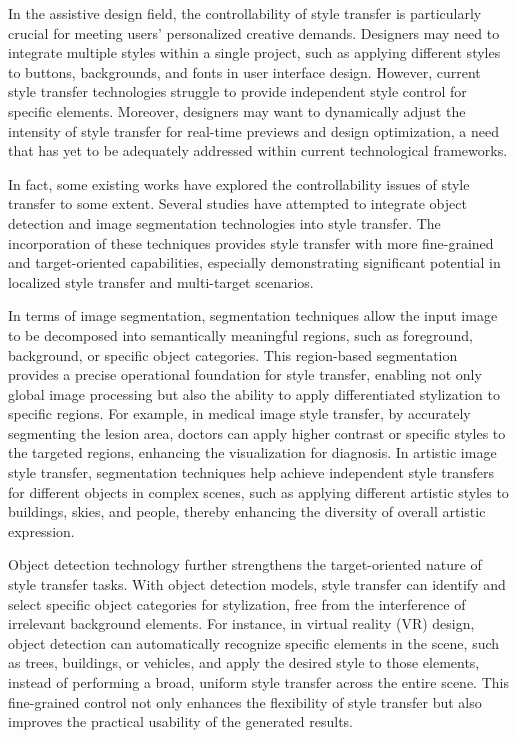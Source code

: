 \documentclass[preprint,12pt]{elsarticle}
\begin{document}
In the assistive design field\citep{10liu2021self,11bae2023unsupervised,12hollein2022stylemesh,13yin20213dstylenet,14yang2022industrial}, the controllability of style transfer is particularly crucial for meeting users' personalized creative demands. Designers may need to integrate multiple styles within a single project, such as applying different styles to buttons, backgrounds, and fonts in user interface design. However, current style transfer technologies struggle to provide independent style control for specific elements. Moreover, designers may want to dynamically adjust the intensity of style transfer for real-time previews and design optimization, a need that has yet to be adequately addressed within current technological frameworks.

In fact, some existing works \citep{52wang2023interactive,78lin2023adacm,03li2023frequency,80cheng2023user,62zhang2023inversion,64wang2023stylediffusion} have explored the controllability issues of style transfer to some extent. Several studies\citep{107yu2024foreground,109ding2024regional} have attempted to integrate object detection and image segmentation technologies into style transfer. The incorporation of these techniques provides style transfer with more fine-grained and target-oriented capabilities, especially demonstrating significant potential in localized style transfer and multi-target scenarios.

In terms of image segmentation\citep{127wang2022learning,128minaee2021image}, segmentation techniques allow the input image to be decomposed into semantically meaningful regions, such as foreground, background, or specific object categories. This region-based segmentation provides a precise operational foundation for style transfer, enabling not only global image processing but also the ability to apply differentiated stylization to specific regions. For example, in medical image style transfer, by accurately segmenting the lesion area, doctors can apply higher contrast or specific styles to the targeted regions, enhancing the visualization for diagnosis. In artistic image style transfer, segmentation techniques help achieve independent style transfers for different objects in complex scenes, such as applying different artistic styles to buildings, skies, and people, thereby enhancing the diversity of overall artistic expression.

Object detection technology\citep{120wang2022visual, 129kaur2023comprehensive} further strengthens the target-oriented nature of style transfer tasks. With object detection models, style transfer can identify and select specific object categories for stylization, free from the interference of irrelevant background elements. For instance, in virtual reality (VR) design, object detection can automatically recognize specific elements in the scene, such as trees, buildings, or vehicles, and apply the desired style to those elements, instead of performing a broad, uniform style transfer across the entire scene. This fine-grained control not only enhances the flexibility of style transfer but also improves the practical usability of the generated results.
\end{document}
